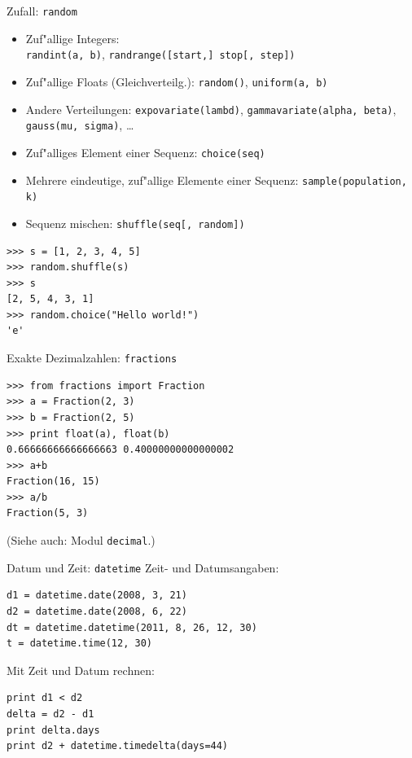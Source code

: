 \begin{frame}[fragile]{Zufall: \texttt{random}}
\begin{itemize}
\item Zuf"allige Integers: \\ \texttt{randint(a, b)},  \texttt{randrange([start,] stop[, step])}
\item Zuf"allige Floats (Gleichverteilg.): \texttt{random()}, \texttt{uniform(a, b)}
\item Andere Verteilungen: \texttt{expovariate(lambd)}, \texttt{gammavariate(alpha, beta)}, \texttt{gauss(mu, sigma)}, \dots
\item Zuf"alliges Element einer Sequenz: \texttt{choice(seq)}
\item Mehrere eindeutige, zuf"allige Elemente einer Sequenz: \texttt{sample(population, k)}
\item Sequenz mischen: \texttt{shuffle(seq[, random])}
\end{itemize}
\begin{lstlisting}[style=Python]
>>> s = [1, 2, 3, 4, 5]
>>> random.shuffle(s)
>>> s
[2, 5, 4, 3, 1]
>>> random.choice("Hello world!")
'e'
\end{lstlisting}
\end{frame}


\begin{frame}[fragile]{Exakte Dezimalzahlen: \texttt{fractions}}

\begin{lstlisting}
>>> from fractions import Fraction
>>> a = Fraction(2, 3)
>>> b = Fraction(2, 5)
>>> print float(a), float(b)
0.66666666666666663 0.40000000000000002
>>> a+b
Fraction(16, 15)
>>> a/b
Fraction(5, 3)
\end{lstlisting}

(Siehe auch: Modul \texttt{decimal}.)
\end{frame}


\begin{frame}[fragile]{Datum und Zeit: \texttt{datetime}}
Zeit- und Datumsangaben:
\begin{lstlisting}
d1 = datetime.date(2008, 3, 21)  
d2 = datetime.date(2008, 6, 22)
dt = datetime.datetime(2011, 8, 26, 12, 30)
t = datetime.time(12, 30)
\end{lstlisting}
Mit Zeit und Datum rechnen:
\begin{lstlisting}
print d1 < d2
delta = d2 - d1
print delta.days
print d2 + datetime.timedelta(days=44)
\end{lstlisting}
\end{frame}


